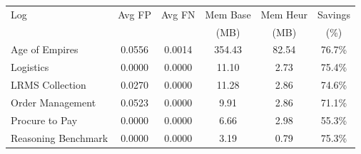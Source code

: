 \begin{table}[ht]
\centering
\begin{tabular}{l|cc|ccc}
\toprule
Log & Avg FP & Avg FN & Mem Base & Mem Heur & Savings \\
 & & & (MB) & (MB) & (\%) \\
\midrule
Age of Empires & 0.0556 & 0.0014 & 354.43 & 82.54 & 76.7\% \\
Logistics & 0.0000 & 0.0000 & 11.10 & 2.73 & 75.4\% \\
LRMS Collection & 0.0270 & 0.0000 & 11.28 & 2.86 & 74.6\% \\
Order Management & 0.0523 & 0.0000 & 9.91 & 2.86 & 71.1\% \\
Procure to Pay & 0.0000 & 0.0000 & 6.66 & 2.98 & 55.3\% \\
Reasoning Benchmark & 0.0000 & 0.0000 & 3.19 & 0.79 & 75.3\% \\
\bottomrule
\end{tabular}
\end{table}
